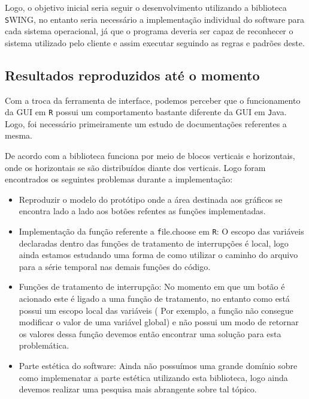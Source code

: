 \documentclass[12pt,letterpaper]{article}
\begin{document}
Logo, o objetivo inicial seria seguir o desenvolvimento utilizando a biblioteca \texttt SWING, no entanto seria necessário a implementação individual do software para cada sistema operacional, já que o programa deveria ser capaz de  reconhecer o sistema utilizado pelo cliente e assim executar seguindo as regras e padrões deste.

\subsection{Resultados reproduzidos até o momento}

Com a troca da ferramenta de interface, podemos perceber que o funcionamento da GUI em \texttt R possui um comportamento bastante diferente da GUI em \texttt Java. Logo, foi necessário primeiramente um estudo de documentações referentes a mesma.

De acordo com \cite{rgtk2} a biblioteca funciona por meio de blocos verticais e horizontais, onde os horizontais se são distribuídos diante dos verticais. Logo foram encontrados os seguintes problemas durante a implementação:

\begin{itemize}
\item Reproduzir o modelo do protótipo onde a área destinada aos gráficos se encontra lado a lado aos botões refentes as funções implementadas.
\item Implementação da função referente a \texttt file.choose em \texttt R: O escopo das variáveis declaradas dentro das funções de tratamento de interrupções é local, logo ainda estamos estudando uma forma de como utilizar o caminho do arquivo para a série temporal nas demais funções do código.
\item Funções de tratamento de interrupção: No momento em que um botão é acionado este é ligado a uma função de tratamento, no entanto como está possui um escopo local das variáveis ( Por exemplo, a função não consegue modificar o valor de uma variável global) e não possui um modo de retornar os valores dessa função devemos então encontrar uma solução para esta problemática.
\item Parte estética do software: Ainda não possuímos uma grande domínio sobre como implemenatar a parte estética utilizando esta biblioteca, logo ainda devemos realizar uma pesquisa mais abrangente sobre tal tópico.
\end{itemize}
\end{document}
